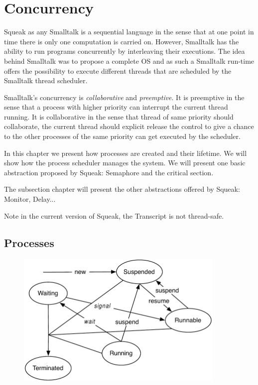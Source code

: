\documentclass[a4paper,10pt,twoside]{book}
\begin{document}
\fi
\sloppy
\chapter{Concurrency}\label{cha:basic}

Squeak as any Smalltalk is a sequential language in the sense that at one point in time there is only 
one computation is carried on. However, Smalltalk has the ability to run programs concurrently by interleaving their 
executions. The idea behind Smalltalk was to propose a complete OS and as such a Smalltalk run-time offers the possibility to execute different threads that are scheduled by the Smalltalk thread scheduler. 

Smalltalk's concurrency is \emph{collaborative} and \emph{preemptive}. It is preemptive in the sense that a process with higher priority can interrupt the current thread running. It is collaborative in the sense that thread of same priority should collaborate, the current thread should explicit release the control to give a chance to the other processes of the same priority can get executed by the scheduler. 

In this chapter we present how processes are created and their lifetime. We will show how the process scheduler manages the system. We will present one basic abstraction proposed by Squeak:  Semaphore and the critical section. 

The subsection chapter will present the other abstractions offered by Squeak: Monitor, Delay...

Note in the current version of Squeak, the Transcript is not thread-safe. 

\section{Processes}


\begin{figure}
\includegraphics[width=10cm]{ProcessState}
\end{figure}
\end{document}

